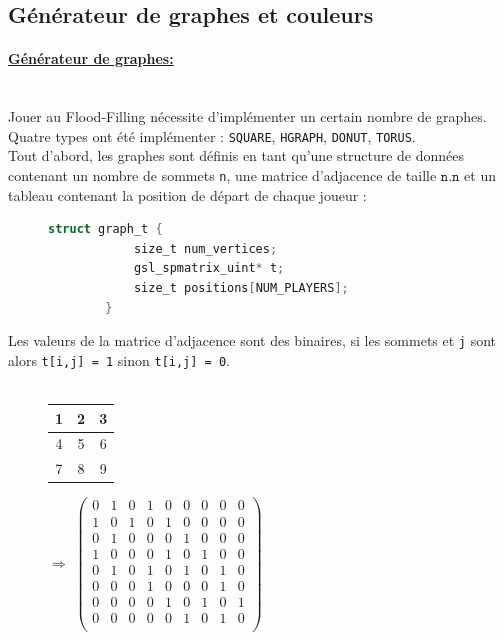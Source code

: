 \documentclass[11pt]{article}
\begin{document}
\subsection{Générateur de graphes et couleurs}
\paragraph{\underline{Générateur de graphes:}\\\\}
Jouer au Flood-Filling nécessite d'implémenter un certain nombre de graphes. Quatre types ont été implémenter : \texttt{SQUARE}, \texttt{HGRAPH}, \texttt{DONUT}, \texttt{TORUS}.\\ 

Tout d'abord, les graphes sont définis en tant qu'une structure de données contenant un nombre de sommets \texttt{n}, une matrice d'adjacence de taille $\texttt{n.n}$ et un tableau contenant la position de départ de chaque joueur : \\
\begin{figure}[h!]
    \centering
    \begin{lstlisting}[language=C]
        struct graph_t {
            size_t num_vertices;
            gsl_spmatrix_uint* t;
            size_t positions[NUM_PLAYERS];
        }
    \end{lstlisting}
\end{figure} 
\newpage
Les valeurs de la matrice d'adjacence sont des binaires, si les sommets  et \texttt{j} sont alors \texttt{t[i,j] = 1} sinon \texttt{t[i,j] = 0}. \\ \\
\newline
\begin{figure}[h!]
    \centering
    \begin{tabular}{|c|c|c|}
        \hline
        1\cellcolor{white} & 2\cellcolor{white} & 3\cellcolor{white}  \\
         \hline
         4\cellcolor{white} & 5\cellcolor{white} & 6\cellcolor{white}  \\
         \hline
         7\cellcolor{white} & 8\cellcolor{white} & 9\cellcolor{white}  \\
         \hline
    \end{tabular}
     $\Longrightarrow$
    $\begin{pmatrix}
        0 & 1 & 0 & 1 & 0 & 0 & 0 & 0 & 0 \\
        1 & 0 & 1 & 0 & 1 & 0 & 0 & 0 & 0 \\
        0 & 1 & 0 & 0 & 0 & 1 & 0 & 0 & 0 \\
        1 & 0 & 0 & 0 & 1 & 0 & 1 & 0 & 0 \\
        0 & 1 & 0 & 1 & 0 & 1 & 0 & 1 & 0 \\
        0 & 0 & 0 & 1 & 0 & 0 & 0 & 1 & 0 \\
        0 & 0 & 0 & 0 & 1 & 0 & 1 & 0 & 1 \\
        0 & 0 & 0 & 0 & 0 & 1 & 0 & 1 & 0 \\
    \end{pmatrix}$
\end{figure}
\end{document}
